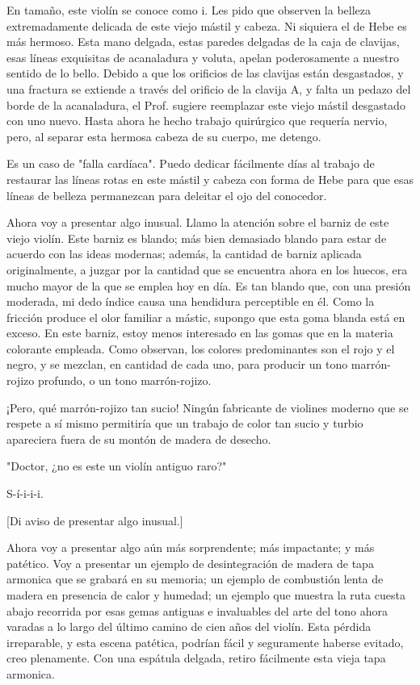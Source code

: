 \documentclass[12pt]{book}
\begin{document}
En tamaño, este violín se conoce como i. Les pido que observen la belleza extremadamente delicada de este viejo mástil y cabeza. Ni siquiera el de Hebe es más hermoso. Esta mano delgada, estas paredes delgadas de la caja de clavijas, esas líneas exquisitas de acanaladura y voluta, apelan poderosamente a nuestro sentido de lo bello. Debido a que los orificios de las clavijas están desgastados, y una fractura se extiende a través del orificio de la clavija A, y falta un pedazo del borde de la acanaladura, el Prof. sugiere reemplazar este viejo mástil desgastado con uno nuevo. Hasta ahora he hecho trabajo quirúrgico que requería nervio, pero, al separar esta hermosa cabeza de su cuerpo, me detengo.

Es un caso de "falla cardíaca". Puedo dedicar fácilmente días al trabajo de restaurar las líneas rotas en este mástil y cabeza con forma de Hebe para que esas líneas de belleza permanezcan para deleitar el ojo del conocedor.

Ahora voy a presentar algo inusual. Llamo la atención sobre el barniz de este viejo violín. Este barniz es blando; más bien demasiado blando para estar de acuerdo con las ideas modernas; además, la cantidad de barniz aplicada originalmente, a juzgar por la cantidad que se encuentra ahora en los huecos, era mucho mayor de la que se emplea hoy en día. Es tan blando que, con una presión moderada, mi dedo índice causa una hendidura perceptible en él. Como la fricción produce el olor familiar a mástic, supongo que esta goma blanda está en exceso. En este barniz, estoy menos interesado en las gomas que en la materia colorante empleada. Como observan, los colores predominantes son el rojo y el negro, y se mezclan, en cantidad de cada uno, para producir un tono marrón-rojizo profundo, o un tono marrón-rojizo.

¡Pero, qué marrón-rojizo tan sucio! Ningún fabricante de violines moderno que se respete a sí mismo permitiría que un trabajo de color tan sucio y turbio apareciera fuera de su montón de madera de desecho.

"Doctor, ¿no es este un violín antiguo raro?"

S-í-i-i-i.

[Di aviso de presentar algo inusual.]

Ahora voy a presentar algo aún más sorprendente; más impactante; y más patético. Voy a presentar un ejemplo de desintegración de madera de tapa armonica que se grabará en su memoria; un ejemplo de combustión lenta de madera en presencia de calor y humedad; un ejemplo que muestra la ruta cuesta abajo recorrida por esas gemas antiguas e invaluables del arte del tono ahora varadas a lo largo del último camino de cien años del violín. Esta pérdida irreparable, y esta escena patética, podrían fácil y seguramente haberse evitado, creo plenamente. Con una espátula delgada, retiro fácilmente esta vieja tapa armonica.
\end{document}
